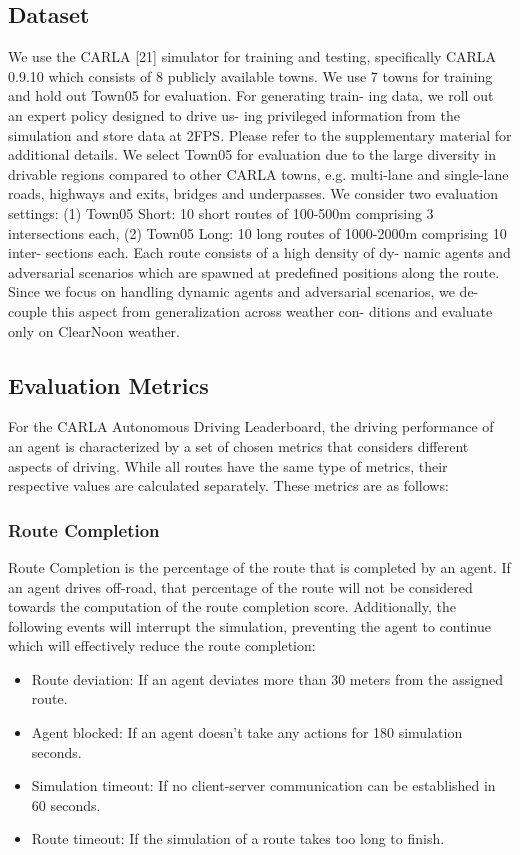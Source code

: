 \documentclass[letterpaper, 12pt]{article}
\theoremstyle{definition}
\theoremstyle{definition}
\theoremstyle{definition}
\theoremstyle{definition}
\theoremstyle{definition}
\begin{document}
\subsection{Dataset}
\label{sec:orge49775b}
We use the CARLA [21] simulator for training
and testing, specifically CARLA 0.9.10 which consists of
8 publicly available towns. We use 7 towns for training
and hold out Town05 for evaluation. For generating train-
ing data, we roll out an expert policy designed to drive us-
ing privileged information from the simulation and store
data at 2FPS. Please refer to the supplementary material
for additional details. We select Town05 for evaluation
due to the large diversity in drivable regions compared to
other CARLA towns, e.g. multi-lane and single-lane roads,
highways and exits, bridges and underpasses. We consider
two evaluation settings: (1) Town05 Short: 10 short routes
of 100-500m comprising 3 intersections each, (2) Town05
Long: 10 long routes of 1000-2000m comprising 10 inter-
sections each. Each route consists of a high density of dy-
namic agents and adversarial scenarios which are spawned
at predefined positions along the route. Since we focus on
handling dynamic agents and adversarial scenarios, we de-
couple this aspect from generalization across weather con-
ditions and evaluate only on ClearNoon weather.
\subsection{Evaluation Metrics \label{orge3f31f2}}
\label{sec:orgd7dfc4f}
For the CARLA Autonomous Driving Leaderboard, the driving performance of an
agent is characterized by a set of chosen metrics that considers different
aspects of driving. While all routes have the same type of metrics, their
respective values are calculated separately. These metrics are as follows:

\subsubsection{Route Completion}
\label{sec:orgaa6f3ff}
Route Completion is the percentage of the route that is completed by an
agent. If an agent drives off-road, that percentage of the route will not be
considered towards the computation of the route completion score. Additionally,
the following events will interrupt the simulation, preventing the agent to
continue which will effectively reduce the route completion:

\begin{itemize}
\item Route deviation: If an agent deviates more than 30 meters from the assigned route.
\item Agent blocked: If an agent doesn’t take any actions for 180 simulation seconds.
\item Simulation timeout: If no client-server communication can be established in 60 seconds.
\item Route timeout: If the simulation of a route takes too long to finish.
\end{itemize}
\end{document}
